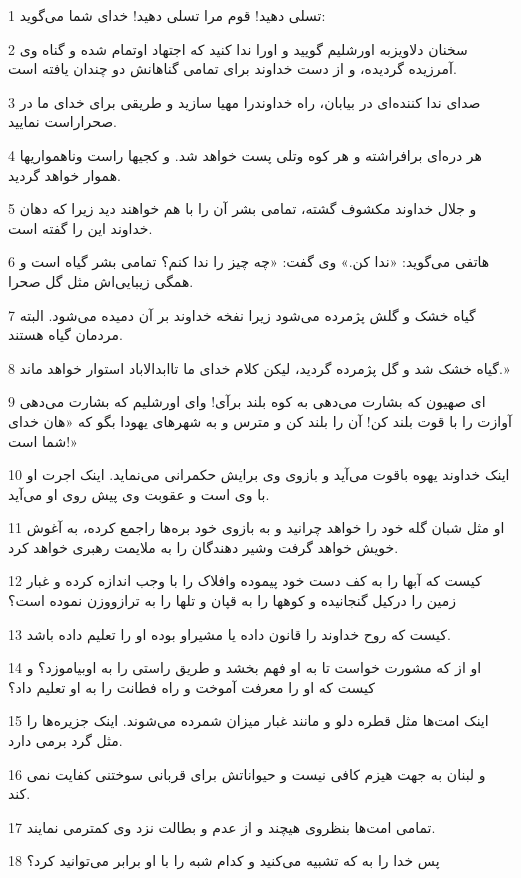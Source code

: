 \par 1 تسلی دهید! قوم مرا تسلی دهید! خدای شما می‌گوید:
\par 2 سخنان دلاویزبه اورشلیم گویید و اورا ندا کنید که اجتهاد اوتمام شده و گناه وی آمرزیده گردیده، و از دست خداوند برای تمامی گناهانش دو چندان یافته است.
\par 3 صدای ندا کننده‌ای در بیابان، راه خداوندرا مهیا سازید و طریقی برای خدای ما در صحراراست نمایید.
\par 4 هر دره‌ای برافراشته و هر کوه وتلی پست خواهد شد. و کجیها راست وناهمواریها هموار خواهد گردید.
\par 5 و جلال خداوند مکشوف گشته، تمامی بشر آن را با هم خواهند دید زیرا که دهان خداوند این را گفته است.
\par 6 هاتفی می‌گوید: «ندا کن.» وی گفت: «چه چیز را ندا کنم؟ تمامی بشر گیاه است و همگی زیبایی‌اش مثل گل صحرا.
\par 7 گیاه خشک و گلش پژمرده می‌شود زیرا نفخه خداوند بر آن دمیده می‌شود. البته مردمان گیاه هستند.
\par 8 گیاه خشک شد و گل پژمرده گردید، لیکن کلام خدای ما تاابدالاباد استوار خواهد ماند.»
\par 9 ‌ای صهیون که بشارت می‌دهی به کوه بلند برآی! و‌ای اورشلیم که بشارت می‌دهی آوازت را با قوت بلند کن! آن را بلند کن و مترس و به شهرهای یهودا بگو که «هان خدای شما است!»
\par 10 اینک خداوند یهوه باقوت می‌آید و بازوی وی برایش حکمرانی می‌نماید. اینک اجرت او با وی است و عقوبت وی پیش روی او می‌آید.
\par 11 او مثل شبان گله خود را خواهد چرانید و به بازوی خود بره‌ها راجمع کرده، به آغوش خویش خواهد گرفت وشیر دهندگان را به ملایمت رهبری خواهد کرد.
\par 12 کیست که آبها را به کف دست خود پیموده وافلاک را با وجب اندازه کرده و غبار زمین را درکیل گنجانیده و کوهها را به قپان و تلها را به ترازووزن نموده است؟
\par 13 کیست که روح خداوند را قانون داده یا مشیراو بوده او را تعلیم داده باشد.
\par 14 او از که مشورت خواست تا به او فهم بخشد و طریق راستی را به اوبیاموزد؟ و کیست که او را معرفت آموخت و راه فطانت را به او تعلیم داد؟ 
\par 15 اینک امت‌ها مثل قطره دلو و مانند غبار میزان شمرده می‌شوند. اینک جزیره‌ها را مثل گرد برمی دارد.
\par 16 و لبنان به جهت هیزم کافی نیست و حیواناتش برای قربانی سوختنی کفایت نمی کند.
\par 17 تمامی امت‌ها بنظروی هیچند و از عدم و بطالت نزد وی کمترمی نمایند.
\par 18 پس خدا را به که تشبیه می‌کنید و کدام شبه را با او برابر می‌توانید کرد؟
